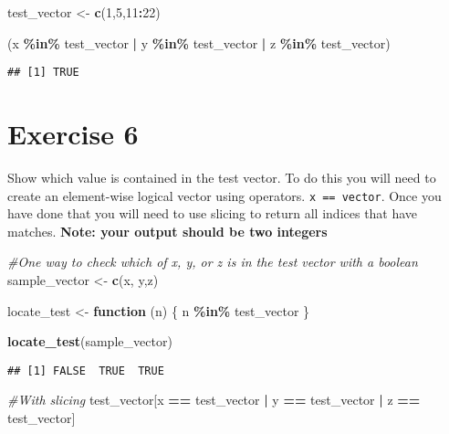 \documentclass[
]{article}
\newenvironment{Shaded}{\begin{snugshade}}{\end{snugshade}}
\newcommand{\CommentTok}[1]{\textcolor[rgb]{0.56,0.35,0.01}{\textit{#1}}}
\newcommand{\ControlFlowTok}[1]{\textcolor[rgb]{0.13,0.29,0.53}{\textbf{#1}}}
\newcommand{\DecValTok}[1]{\textcolor[rgb]{0.00,0.00,0.81}{#1}}
\newcommand{\FunctionTok}[1]{\textcolor[rgb]{0.13,0.29,0.53}{\textbf{#1}}}
\newcommand{\NormalTok}[1]{#1}
\newcommand{\OtherTok}[1]{\textcolor[rgb]{0.56,0.35,0.01}{#1}}
\newcommand{\SpecialCharTok}[1]{\textcolor[rgb]{0.81,0.36,0.00}{\textbf{#1}}}
\begin{document}
\begin{Shaded}
\begin{Highlighting}[]
\NormalTok{test\_vector }\OtherTok{\textless{}{-}} \FunctionTok{c}\NormalTok{(}\DecValTok{1}\NormalTok{,}\DecValTok{5}\NormalTok{,}\DecValTok{11}\SpecialCharTok{:}\DecValTok{22}\NormalTok{)}

\NormalTok{(x }\SpecialCharTok{\%in\%}\NormalTok{ test\_vector }\SpecialCharTok{|}\NormalTok{ y }\SpecialCharTok{\%in\%}\NormalTok{ test\_vector }\SpecialCharTok{|}\NormalTok{ z }\SpecialCharTok{\%in\%}\NormalTok{ test\_vector)}
\end{Highlighting}
\end{Shaded}

\begin{verbatim}
## [1] TRUE
\end{verbatim}

\section{Exercise 6}\label{exercise-6}

Show which value is contained in the test vector. To do this you will
need to create an element-wise logical vector using operators.
\texttt{x\ ==\ vector}. Once you have done that you will need to use
slicing to return all indices that have matches. \textbf{Note: your
output should be two integers}

\begin{Shaded}
\begin{Highlighting}[]
\CommentTok{\#One way to check which of x, y, or z is in the test vector with a boolean}
\NormalTok{sample\_vector }\OtherTok{\textless{}{-}} \FunctionTok{c}\NormalTok{(x, y,z)}

\NormalTok{locate\_test }\OtherTok{\textless{}{-}} \ControlFlowTok{function}\NormalTok{ (n) \{}
\NormalTok{  n }\SpecialCharTok{\%in\%}\NormalTok{ test\_vector}
\NormalTok{\}}

\FunctionTok{locate\_test}\NormalTok{(sample\_vector)}
\end{Highlighting}
\end{Shaded}

\begin{verbatim}
## [1] FALSE  TRUE  TRUE
\end{verbatim}

\begin{Shaded}
\begin{Highlighting}[]
\CommentTok{\#With slicing}
\NormalTok{test\_vector[x }\SpecialCharTok{==}\NormalTok{ test\_vector }\SpecialCharTok{|}\NormalTok{ y }\SpecialCharTok{==}\NormalTok{ test\_vector }\SpecialCharTok{|}\NormalTok{ z }\SpecialCharTok{==}\NormalTok{ test\_vector]}
\end{Highlighting}
\end{Shaded}
\end{document}
